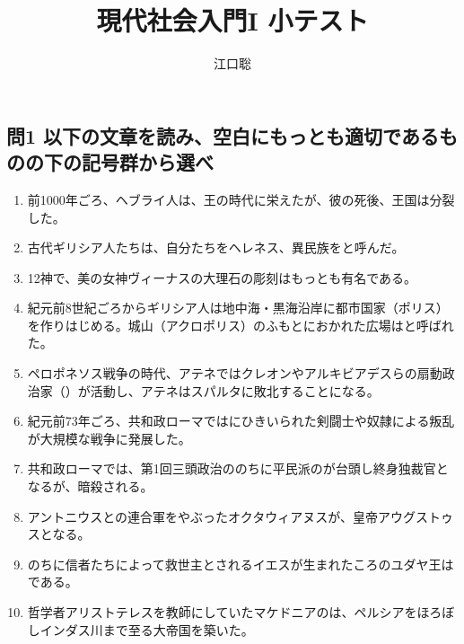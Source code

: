 \documentclass[uplatex,dvipdfmx]{jsarticle}
\author{江口聡}
\title{現代社会入門I 小テスト}
\begin{document}
\maketitle

\subsection*{問1 以下の文章を読み、空白にもっとも適切であるものの下の記号群から選べ }

\begin{enumerate}

\setlength{\parskip}{.9zw}
\setlength{\itemsep}{.9zw}


\item  前1000年ごろ、ヘブライ人は、王の時代に栄えたが、彼の死後、王国は分裂した。


\item 古代ギリシア人たちは、自分たちをヘレネス、異民族をと呼んだ。

  
\item {}12神で、美の女神ヴィーナスの大理石の彫刻はもっとも有名である。

  
\item 紀元前8世紀ごろからギリシア人は地中海・黒海沿岸に都市国家（ポリス）を作りはじめる。城山（アクロポリス）のふもとにおかれた広場はと呼ばれた。

  
\item ペロポネソス戦争の時代、アテネではクレオンやアルキビアデスらの扇動政治家（）が活動し、アテネはスパルタに敗北することになる。
  

\item 紀元前73年ごろ、共和政ローマではにひきいられた剣闘士や奴隷による叛乱が大規模な戦争に発展した。

  
\item 共和政ローマでは、第1回三頭政治ののちに平民派のが台頭し終身独裁官となるが、暗殺される。

  
\item アントニウスとの連合軍をやぶったオクタウィアヌスが、皇帝アウグストゥスとなる。
  
\item のちに信者たちによって救世主とされるイエスが生まれたころのユダヤ王はである。
  
\item 哲学者アリストテレスを教師にしていたマケドニアのは、ペルシアをほろぼしインダス川まで至る大帝国を築いた。
  


\end{enumerate}
\end{document}
